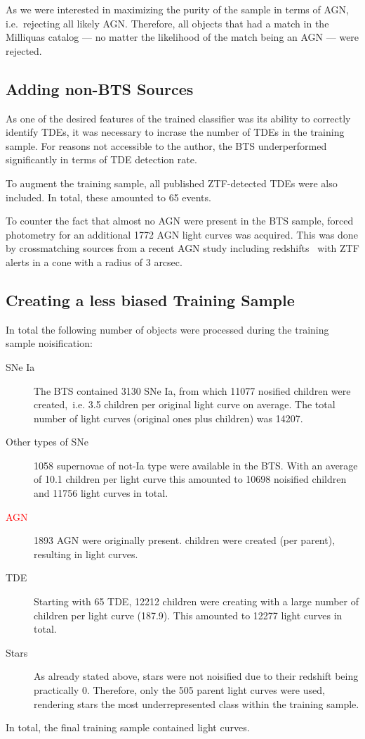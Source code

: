 As we were interested in maximizing the purity of the sample in terms of AGN, i.e.~rejecting all likely AGN. Therefore, all objects that had a match in the Milliquas catalog --- no matter the likelihood of the match being an AGN --- were rejected.

\subsection{Adding non-BTS Sources}\label{addsources}
As one of the desired features of the trained classifier was its ability to correctly identify TDEs, it was necessary to incrase the number of TDEs in the training sample. For reasons not accessible to the author, the BTS underperformed significantly in terms of TDE detection rate.

To augment the training sample, all published ZTF-detected TDEs were also included. In total, these amounted to 65 events.

To counter the fact that almost no AGN were present in the BTS sample, forced photometry for an additional 1772 AGN light curves was acquired. This was done by crossmatching sources from a recent AGN study including redshifts~ with ZTF alerts in a cone with a radius of 3 arcsec.

\subsection{Creating a less biased Training Sample}
In total the following number of objects were processed during the training sample noisification:
\begin{description}
    \item[SNe Ia] The BTS contained 3130 SNe Ia, from which 11077 nosified children were created,~i.e. 3.5 children per original light curve on average. The total number of light curves (original ones plus children) was 14207.
    \item[Other types of SNe] 1058 supernovae of not-Ia type were available in the BTS. With an average of 10.1 children per light curve this amounted to 10698 noisified children and 11756 light curves in total.
    \item[\textcolor{red}{AGN}] 1893 AGN were originally present. \xx children were created (\xx per parent), resulting in \xx light curves.
    \item[TDE] Starting with 65 TDE, 12212 children were creating with a large number of children per light curve (187.9). This amounted to 12277 light curves in total.
    \item[Stars] As already stated above, stars were not noisified due to their redshift being practically 0. Therefore, only the 505 parent light curves were used, rendering stars the most underrepresented class within the training sample.
\end{description}
In total, the final training sample contained \xx light curves.

